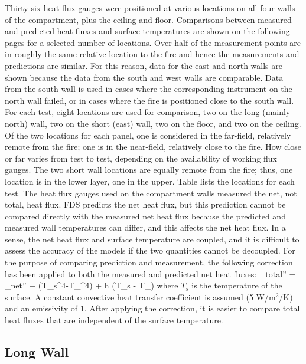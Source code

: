 Thirty-six heat flux gauges were positioned at various locations on all four walls of the compartment,
plus the ceiling and floor.  Comparisons between measured and predicted heat fluxes and surface temperatures are shown
on the following pages for a selected number of locations.
Over half of the measurement points are in roughly the same relative location to the fire and hence
the measurements and predictions are similar.  For this reason, data for the east and north walls are shown
because the data from the south and west walls are comparable.  Data from the south wall is used in cases where
the corresponding instrument on the north wall failed, or in cases where the fire is positioned close to the south wall.
For each test, eight locations are used for comparison, two on the long (mainly north) wall,
two on the short (east) wall, two on the floor, and two on the ceiling.  Of the two locations for each panel,
one is considered in the far-field, relatively remote from the fire; one is in the near-field,
relatively close to the fire.  How close or far varies from test to test, depending on the availability of working flux gauges.
The two short wall locations are equally remote from the fire; thus, one location is in the lower layer, one in the upper.
Table lists the locations for each test.
The heat flux gauges used on the compartment walls measured the net, not total, heat flux.
FDS predicts the net heat flux, but this prediction cannot be compared directly with the measured net heat
flux because the predicted and measured wall temperatures can differ, and this affects the net heat flux.
In a sense, the net heat flux and surface temperature are coupled, and it is difficult to assess the accuracy of the models
if the two quantities cannot be decoupled.  For the purpose of comparing prediction and measurement,
the following correction has been applied to both the measured and predicted net heat fluxes:
\be  \dq_{\hbox{\tiny total}}'' = \dq_{\hbox{\tiny net}}'' + \sigma (T_s^4-T_\infty^4) + h (T_s - T_\infty) \ee
where $T_s$ is the temperature of the surface.  A constant convective heat transfer coefficient is assumed
(5 W/m$^2$/K) and an emissivity of 1.
After applying the correction, it is easier to compare total heat fluxes that are independent of the surface temperature.

\clearpage

\subsection{Long Wall}

